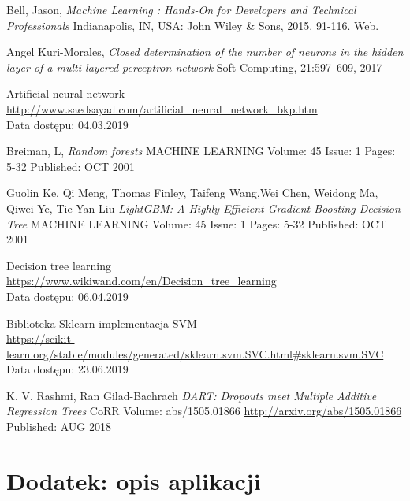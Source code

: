 \documentclass[a4paper, twoside, 11pt, openright]{article}
\begin{document}
\begin{thebibliography}{9}
	Bell, Jason, \textit{Machine Learning : Hands-On for Developers and Technical Professionals}  Indianapolis, IN, USA: John Wiley \& Sons, 2015. 91-116. Web.


	Angel Kuri-Morales, 
  \textit{Closed determination of the number of neurons in the hidden layer of a multi-layered perceptron network}
  Soft Computing, 21:597–609, 2017

	Artificial neural network
	\\\url{http://www.saedsayad.com/artificial_neural_network_bkp.htm} 
	\\Data dostępu: 04.03.2019

	Breiman, L, 
  \textit{Random forests}
	MACHINE LEARNING  Volume: 45   Issue: 1   Pages: 5-32   Published: OCT 2001

Guolin Ke, Qi Meng, Thomas Finley, Taifeng Wang,Wei Chen, Weidong Ma, Qiwei Ye, Tie-Yan Liu
  \textit{LightGBM: A Highly Efficient Gradient Boosting Decision Tree}
	MACHINE LEARNING  Volume: 45   Issue: 1   Pages: 5-32   Published: OCT 2001

	Decision tree learning
	\\\url{https://www.wikiwand.com/en/Decision_tree_learning} 
	\\Data dostępu: 06.04.2019

	Biblioteka Sklearn implementacja SVM
	\\\url{https://scikit-learn.org/stable/modules/generated/sklearn.svm.SVC.html#sklearn.svm.SVC}
	\\Data dostępu: 23.06.2019

	K. V. Rashmi, Ran Gilad-Bachrach
	\textit{DART: Dropouts meet Multiple Additive Regression Trees}
	CoRR Volume: abs/1505.01866 \url{http://arxiv.org/abs/1505.01866} Published: AUG 2018

\end{thebibliography}

\newpage

\listoffigures

\newpage 

\listoftables

\newpage

\section{Dodatek: opis aplikacji}
\end{document}
